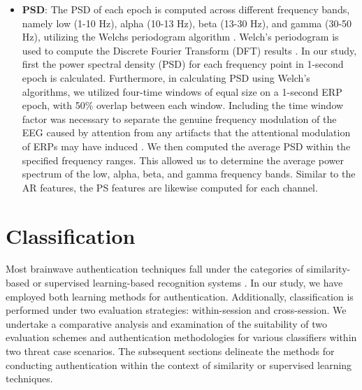 \begin{itemize}
\item \textbf{\large PSD}: The PSD of each epoch is computed across different frequency bands, namely low (1-10 Hz), alpha (10-13 Hz), beta (13-30 Hz), and gamma (30-50 Hz), utilizing the Welchs periodogram algorithm \cite{arias2023performance}. Welch's periodogram is used to compute the Discrete Fourier Transform (DFT) results \cite{survey_brain_biometrics}. In our study, first the power spectral density (PSD) for each frequency point in 1-second epoch is calculated. Furthermore, in calculating PSD using Welch's algorithms, we utilized four-time windows of equal size on a 1-second ERP epoch, with 50$\%$ overlap between each window. Including the time window factor was necessary to separate the genuine frequency modulation of the EEG caused by attention from any artifacts that the attentional modulation of ERPs may have induced \cite{comez1998frequency}. We then computed the average PSD within the specified frequency ranges.  This allowed us to determine the average power spectrum of the low, alpha, beta, and gamma frequency bands. Similar to the AR features, the PS features are likewise computed for each channel.    


\end{itemize}
\section{Classification}
\label{sec:Framework:Classification}

Most brainwave authentication techniques fall under the categories of similarity-based or supervised learning-based recognition systems \cite{survey_brain_biometrics}. In our study, we have employed both learning methods for authentication. Additionally, classification is performed under two evaluation strategies: within-session and cross-session. We undertake a comparative analysis and examination of the suitability of two evaluation schemes and authentication methodologies for various classifiers within two threat case scenarios. The subsequent sections delineate the methods for conducting authentication within the context of similarity or supervised learning techniques.

